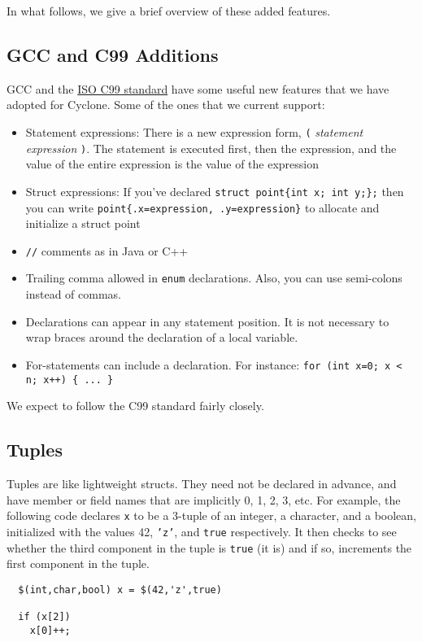 In what follows, we give a brief overview of these added features.  

\subsection{GCC and C99 Additions}

GCC and the
\href{http://web.onetelnet.ch/~twolf/tw/c/c9x_changes.html}{ISO C99
  standard} have some useful new features that we have adopted for
Cyclone. Some of the ones that we current support:
\begin{itemize}
\item Statement expressions: There is a new expression form,
  \texttt{(\lb} \textit{statement} \textit{expression} \texttt{\rb)}.
  The statement is executed first, then the expression, and the value
  of the entire expression is the value of the expression
\item Struct expressions:  If you've declared
  \verb|struct point{int x; int y;};| then you can write
  \verb|point{.x=expression, .y=expression}| to allocate and
  initialize a struct point
\item \texttt{//} comments as in Java or C++
\item Trailing comma allowed in \texttt{enum} declarations.  Also, you
  can use semi-colons instead of commas.
\item Declarations can appear in any statement position.  It is not
  necessary to wrap braces around the declaration of a local variable.
\item For-statements can include a declaration. For instance:
  \verb|for (int x=0; x < n; x++) { ... }|
\end{itemize}

We expect to follow the C99 standard fairly closely.  


\subsection{Tuples}
Tuples are like lightweight structs.  They need not be declared in
advance, and have member or field names that are implicitly 0, 1, 2,
3, etc.  For example, the following code declares \texttt{x} to be a
3-tuple of an integer, a character, and a boolean, initialized with
the values 42, \texttt{'z'}, and \texttt{true} respectively.  It then
checks to see whether the third component in the tuple is \texttt{true}
(it is) and if so, increments the first component in the tuple.
\begin{verbatim}
  $(int,char,bool) x = $(42,'z',true)

  if (x[2]) 
    x[0]++;
\end{verbatim}

